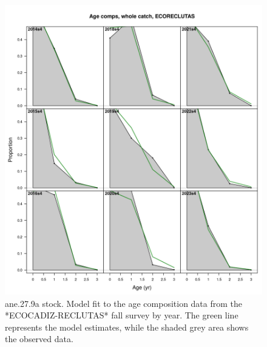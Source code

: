 \documentclass[
]{article}
\begin{document}
\begin{figure}[H]

{\centering \includegraphics[width=0.95\linewidth]{report/run/S1.0_4FLEETS/fig_age_fit_EcocadizRecl} 

}

\caption{ane.27.9a stock. Model fit to the age composition data from the *ECOCADIZ-RECLUTAS* fall survey by year. The green line represents the model estimates, while the shaded grey area shows the observed data.}\label{fig:unnamed-chunk-25}
\end{figure}
\end{document}
